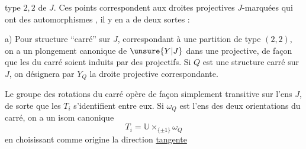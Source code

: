 type $2,2$ de $J$. Ces points correspondent aux droites projectives $J$-marquées qui ont des automorphismes  , il y en a de deux sortes :

a) Pour  structure ``carré'' sur $J$, correspondant à une partition de type $(2,2)$, on a un plongement canonique de $\unsure{Y|J}$ dans une  projective, de façon que les    du carré soient induits par des  projectifs. Si $Q$ est une structure carré sur $J$, on désignera par $Y_Q$ la droite projective correspondante. 


Le groupe des rotations du carré opère de façon simplement transitive sur l'ens $J$, de sorte que les $T_i$ s'identifient entre eux. Si $\omega_Q$ est l'ens des deux orientations du carré,  on a un isom canonique
\[
T_i=\mathbb{U}\times_{\{\pm1\}}\omega_Q
\]
en choisissant comme origine  la direction \uline{tangente}
